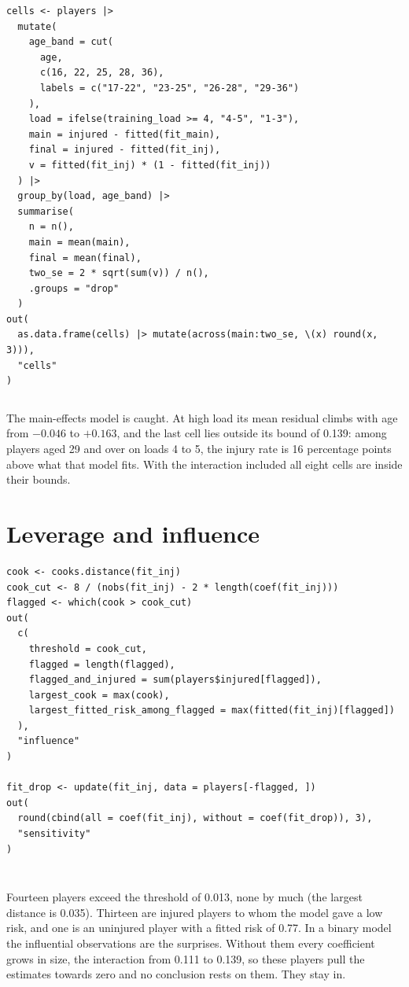 \documentclass[12pt,notitlepage]{report}
\begin{document}
\begin{verbatim}
cells <- players |>
  mutate(
    age_band = cut(
      age,
      c(16, 22, 25, 28, 36),
      labels = c("17-22", "23-25", "26-28", "29-36")
    ),
    load = ifelse(training_load >= 4, "4-5", "1-3"),
    main = injured - fitted(fit_main),
    final = injured - fitted(fit_inj),
    v = fitted(fit_inj) * (1 - fitted(fit_inj))
  ) |>
  group_by(load, age_band) |>
  summarise(
    n = n(),
    main = mean(main),
    final = mean(final),
    two_se = 2 * sqrt(sum(v)) / n(),
    .groups = "drop"
  )
out(
  as.data.frame(cells) |> mutate(across(main:two_se, \(x) round(x, 3))),
  "cells"
)
\end{verbatim}

\inputminted{text}{output/cells.txt}

The main-effects model is caught. At high load its mean residual climbs with
age from $-0.046$ to $+0.163$, and the last cell lies outside its bound of
0.139: among players aged 29 and over on loads 4 to 5, the injury rate is 16
percentage points above what that model fits. With the interaction included
all eight cells are inside their bounds.

\section{Leverage and influence}

\begin{verbatim}
cook <- cooks.distance(fit_inj)
cook_cut <- 8 / (nobs(fit_inj) - 2 * length(coef(fit_inj)))
flagged <- which(cook > cook_cut)
out(
  c(
    threshold = cook_cut,
    flagged = length(flagged),
    flagged_and_injured = sum(players$injured[flagged]),
    largest_cook = max(cook),
    largest_fitted_risk_among_flagged = max(fitted(fit_inj)[flagged])
  ),
  "influence"
)

fit_drop <- update(fit_inj, data = players[-flagged, ])
out(
  round(cbind(all = coef(fit_inj), without = coef(fit_drop)), 3),
  "sensitivity"
)
\end{verbatim}

\inputminted{text}{output/influence.txt}
\inputminted{text}{output/sensitivity.txt}

Fourteen players exceed the threshold of 0.013, none by much (the largest
distance is 0.035). Thirteen are injured players to whom the model gave a low
risk, and one is an uninjured player with a fitted risk of 0.77. In a binary
model the influential observations are the surprises. Without them every
coefficient grows in size, the interaction from 0.111 to 0.139, so these
players pull the estimates towards zero and no conclusion rests on them. They
stay in.
\end{document}
